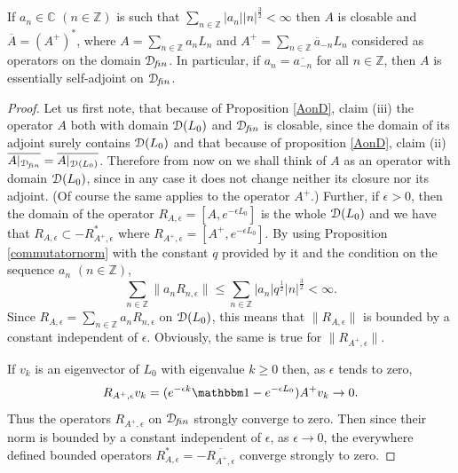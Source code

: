 \documentclass[12pt]{article}
\begin{document}
\begin{theorem} 
If $a_n \in {\mathbb C} \,\, (n \in {\mathbb Z})$ 
is such that 
$\mathop{\sum}_{n \in {\mathbb Z}}|a_n| |n|^{\frac{3}{2}} < \infty$
then $A$ is closable and
$\overline{A}=(A^+)^*$, where 
$A=\mathop{\sum}_{n \in {\mathbb Z}}a_n L_n$ and 
$A^+=\mathop{\sum}_{n \in {\mathbb Z}}\overline{a}_{-n} L_n$
considered as operators on the domain ${\mathcal D}\!_{f\!in}$. 
In particular, if $a_n=\overline{a_{-n}}$ for all 
$n \in {\mathbb Z}$, then $A$ is essentially self-adjoint on ${\mathcal D}\!_{f\!in}$. 
\end{theorem} 
\begin{proof} 
Let us first note, that because of Proposition 
\ref{AonD}, claim (iii) the operator $A$ both with domain ${\mathcal D}(L_0)$ and 
${\mathcal D}\!_{f\!in}$ is closable, since the domain of its adjoint surely contains
${\mathcal D}(L_0)$ and that because of proposition \ref{AonD}, claim (ii) 
$\overline{A|_{{\mathcal D}\!_{f\!in}}}=\overline{A|_{{\mathcal D}(L_0)}}$.
Therefore from now on we shall think of $A$  
as an operator with domain ${\mathcal D}(L_0)$, since in any case it 
does not change neither its closure nor its adjoint.
(Of course the same applies to the operator $A^+$.)  
Further, if $\epsilon > 0$, then the domain of the
operator $R_{A,\epsilon}=[A,e^{-\epsilon L_0}]$ is 
the whole ${\mathcal D}(L_0)$ and we have that 
$R_{A,\epsilon} \subset - R_{A^+,\epsilon}^*$
where $R_{A^+,\epsilon}=[A^+,e^{-\epsilon L_0}]$. 
By using Proposition \ref{commutatornorm} with the constant 
$q$ provided by it and the condition on the sequence 
$a_n \,\, (n \in {\mathbb Z})$,
\begin{equation}
\mathop{\sum}_{n \in {\mathbb Z}}\|a_n R_{n,\epsilon}\| \leq
\mathop{\sum}_{n \in {\mathbb Z}}|a_n| q^{\frac{1}{2}} |n|^{\frac{3}{2}}
< \infty.
\end{equation}
Since $R_{A,\epsilon}=\mathop{\sum}_{n \in {\mathbb Z}}
a_n R_{n,\epsilon}$ on ${\mathcal D}(L_0)$, this means that 
$\|R_{A,\epsilon}\|$ is bounded by a constant independent
of $\epsilon$. Obviously, the same is true for 
$\|R_{A^+,\epsilon}\|$. 

If $v_k$ is an eigenvector of $L_0$ with eigenvalue $k \geq 0$ 
then, as $\epsilon$ tends to zero,
\begin{equation}
R_{{A^+},\epsilon}v_k=(e^{-\epsilon k}{\mathbbm 1}-e^{-\epsilon 
L_0})A^+v_k
\rightarrow 0.
\end{equation}
Thus the operators $R_{A^+,\epsilon}$ on ${\mathcal D}\!_{f\!in}$ strongly converge 
to zero. Then since their norm is bounded 
by a constant independent of $\epsilon$, 
as $\epsilon \rightarrow 0$, the everywhere 
defined bounded operators 
$R_{A,\epsilon}^*=-\overline{R_{A^+,\epsilon}}$
converge strongly to zero. 


\end{proof}
\end{document}
